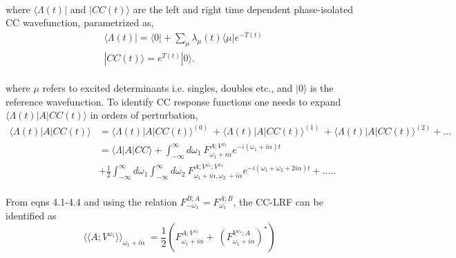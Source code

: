 \\
where $\langle \Lambda(t)|$ and $|CC(t)\rangle$ are the left and right time dependent 
phase-isolated CC wavefunction, parametrized as,
\\
\begin{equation}
\begin{split}
&  \langle \Lambda(t) |  = \langle 0 | + \sum_{\mu}\lambda_{\mu}(t)\langle \mu|e^{-T(t)} \\
& |CC(t)\rangle = e^{T(t)}|0\rangle.
\end{split}
\end{equation}
\\
where $\mu$ refers to excited determinants i.e. singles, doubles etc.,
and $|0\rangle$ is the reference wavefunction. To identify CC response 
functions one needs to expand $\langle \Lambda(t) | A | CC(t)\rangle$ 
in orders of perturbation\cite{Revisited},
\\
\begin{equation}
\begin{split}
\langle \Lambda(t) | A | CC(t) \rangle & = {\langle \Lambda(t) | A | CC(t) \rangle}^{(0)}\
 + {\langle \Lambda(t) | A | CC(t) \rangle}^{(1)} \
+ {\langle \Lambda(t) | A | CC(t) \rangle}^{(2)} + ... \\
& = \langle \Lambda | A | CC \rangle + \int_{-\infty}^{\infty}d\omega_1 \
F^{A;V^{\omega_1}}_{\omega_1 + i\alpha}e^{-i(\omega_1 + i\alpha)t} \\
& + \frac{1}{2} \int_{-\infty}^{\infty}d\omega_1\int_{-\infty}^{\infty}d\omega_2\
F^{A;V^{\omega_1};V^{\omega_2}}_{\omega_1 + i\alpha,\omega_2 \
+ i\alpha}e^{-i(\omega_1 + \omega_2 + 2i\alpha)t} + .....
\end{split}
\end{equation}
\\
From eqns 4.1-4.4 and using the relation $F^{B;A}_{-\omega_1}=F^{A;B}_{\omega_1}$,
the CC-LRF can be identified as
\\
\begin{equation}
{\langle\langle A;V^{\omega_1} \rangle\rangle}_{\omega_1 + i\alpha} \
= \frac{1}{2}( F^{A;V^{\omega_1}}_{\omega_1 + i\alpha} + \
(F^{V^{\omega_1};A}_{\omega_1 + i\alpha})^{*})
\end{equation}
